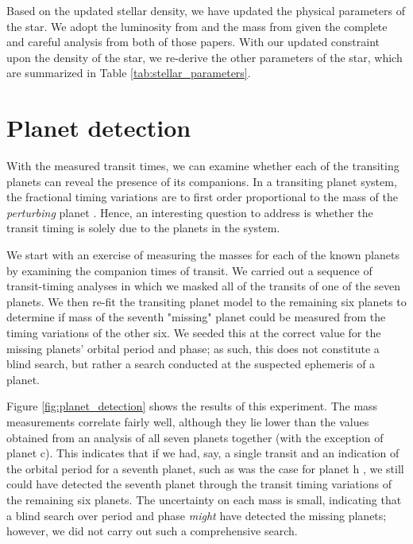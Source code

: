 \documentclass[fleqn,usenatbib]{mnras} %
\begin{document}
Based on the updated stellar density, we have updated the physical
parameters of the star.  We adopt the luminosity from \citet{Ducrot2020}
and the mass from \citet{Mann2019} given the complete and careful analysis
from both of those papers.  With our updated constraint upon the density
of the star, we re-derive the other parameters of the star, which are summarized in Table \ref{tab:stellar_parameters}.

\section{Planet detection} \label{sec:detection}

With the measured transit times, we can examine whether each of the transiting planets can reveal the presence of its companions.
In a transiting planet system, the fractional timing variations are to first order
proportional to the mass of the \emph{perturbing} planet \citep{Agol2005,Lithwick2012}.
Hence, an interesting question to address is whether the transit timing
is solely due to the planets in the system.

We start with an exercise of measuring the masses for each of the 
known planets by examining the companion times of transit.
We carried out a sequence
of transit-timing analyses in which we masked all of the transits of one
of the seven planets.  We then re-fit the transiting planet model to
the remaining six planets to determine if mass of the seventh "missing"
planet could be measured from the timing variations of
the other six.  We seeded this at the correct value for the missing
planets' orbital period and phase; as such, this does not constitute
a blind search, but rather a search conducted at the suspected ephemeris of a planet.

Figure \ref{fig:planet_detection} shows the results of this experiment.
The mass measurements correlate fairly well, although they   
lie lower than the values obtained from an analysis of 
all seven planets together (with the exception of planet c).    This 
indicates that if we had, say, a single transit and an indication of the orbital period for a seventh planet, such as was the case for planet h \citep{Gillon2017,Luger2017a}, we still could have detected 
the seventh planet through the transit timing variations of the 
remaining six planets.  The
uncertainty on each mass is small, indicating that a blind search
over period and phase \emph{might} have detected the missing planets; however, we did not carry out such a comprehensive search.
\end{document}
